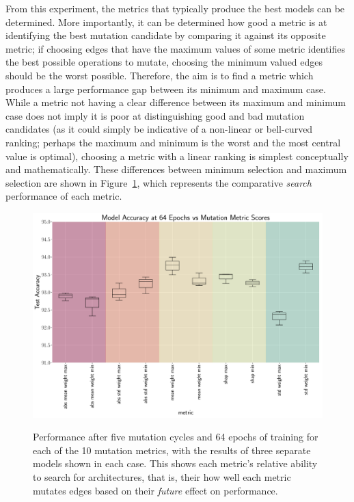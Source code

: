 From this
experiment, the metrics that typically produce the best models can be determined. More importantly, it can be determined how
good a metric is at identifying the best mutation candidate by comparing it against its opposite metric; if choosing
edges that have the maximum values of some metric identifies the best possible operations to mutate,
choosing the minimum valued edges should be the worst possible. Therefore, the aim is to find a metric which produces
a large performance gap between its minimum and maximum case. While a metric not having a clear difference between
its maximum and minimum case does not imply it is poor at distinguishing good and bad mutation candidates (as it
could simply be indicative of a non-linear or bell-curved ranking; perhaps the maximum and minimum is the worst and the
most central value is optimal), choosing a metric with a linear ranking is simplest conceptually and mathematically. These
differences between minimum selection and maximum selection are shown in Figure~\ref{fig:mutation_metrics_full_train},
which represents the comparative \textit{search} performance of each metric.

\begin{figure}[ht]
    \centering
	\includegraphics[width=\textwidth]{accuracy_after_64_epoch} \\
	\caption[Performance after five mutation cycles and 64 epochs of training for each of the 10 mutation metrics]{Performance after five mutation cycles and 64 epochs of training for each of the 10 mutation metrics, with
    the results of three separate models shown in each case. This shows each metric's relative ability to search for
    architectures, that is, their how well each metric mutates edges based on their \textit{future} effect on performance.}
	\label{fig:mutation_metrics_full_train}
\end{figure}

